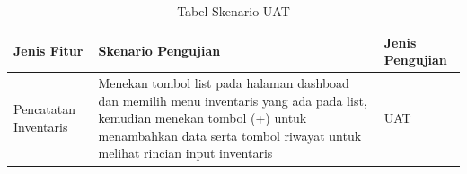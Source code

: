\begin{enumerate}
	\begin{table}[H]	
		\begin{center}
			\caption{Tabel Skenario UAT}
			\label{tab:table9}
			\begin{tabular}{|m{10em}|m{14em}|m{5em}|}
			\hline
			\textbf{Jenis Fitur} & \textbf{Skenario Pengujian} & \textbf{Jenis Pengujian} \\
			\hline
			Pencatatan Inventaris & Menekan tombol list pada halaman dashboad dan memilih menu inventaris yang ada pada list, kemudian menekan tombol (+) untuk menambahkan data serta tombol riwayat untuk melihat rincian input inventaris & UAT \\
			\hline
			\end{tabular}
		\end{center}
	\end{table}	
\end{enumerate}




